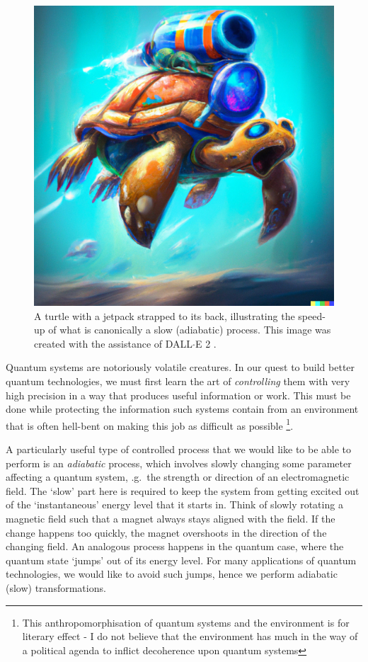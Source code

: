 \documentclass[a4paper,oneside,11pt]{book}
\begin{document}
\begin{figure}
\centering
\includegraphics[width=0.9\linewidth]{images/COLD_turle.png} \caption[DALL$\cdot$E turtle illustration.]{A turtle with a jetpack strapped to its back, illustrating the speed-up of what is canonically a slow (adiabatic) process. This image was created with the assistance of DALL$\cdot$E 2 \cite{noauthor_dalle_nodate}.}\label{fig:COLD_TURTLE}
\vspace{-5pt}
\end{figure}

Quantum systems are notoriously volatile creatures. In our quest to build better quantum technologies, we must first learn the art of \emph{controlling} them with very high precision in a way that produces useful information or work. This must be done while protecting the information such systems contain from an environment that is often hell-bent on making this job as difficult as possible \footnote{This anthropomorphisation of quantum systems and the environment is for literary effect - I do not believe that the environment has much in the way of a political agenda to inflict decoherence upon quantum systems}.

A particularly useful type of controlled process that we would like to be able to perform is an \emph{adiabatic} process, which involves slowly changing some parameter affecting a quantum system, \@e.g.~the strength or direction of an electromagnetic field. The `slow' part here is required to keep the system from getting excited out of the `instantaneous' energy level that it starts in. Think of slowly rotating a magnetic field such that a magnet always stays aligned with the field. If the change happens too quickly, the magnet overshoots in the direction of the changing field. An analogous process happens in the quantum case, where the quantum state `jumps' out of its energy level. For many applications of quantum technologies, we would like to avoid such jumps, hence we perform adiabatic (slow) transformations.
\end{document}
